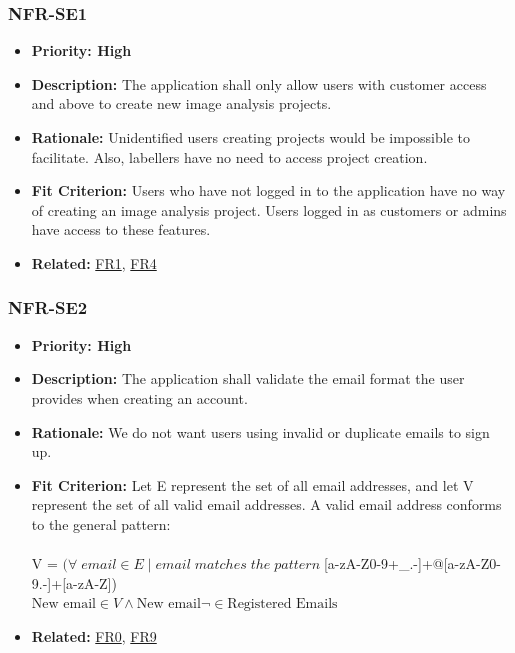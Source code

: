\documentclass[12pt]{article}
\begin{document}
\subsubsection*{NFR-SE1}
\label{sec:SE1}
\begin{itemize}
  \item \textbf{Priority: High}
  \item \textbf{Description:} The application shall only allow users with customer access and above to create new image analysis projects.
  \item \textbf{Rationale:} Unidentified users creating projects would be impossible to facilitate. Also, labellers have no need to access project creation. 
  \item \textbf{Fit Criterion:} Users who have not logged in to the application have no way of creating an image analysis project. Users logged in as customers or admins have access to these features.
  \item \textbf{Related:} \hyperref[sec:FR1]{FR1}, \hyperref[sec:FR4]{FR4}
\end{itemize}
\subsubsection*{NFR-SE2}
\label{sec:SE2}
\begin{itemize}
  \item \textbf{Priority: High}
  \item \textbf{Description:} The application shall validate the email format the user provides when creating an account.
  \item \textbf{Rationale:} We do not want users using invalid or duplicate emails to sign up.
  \item \textbf{Fit Criterion:} Let E represent the set of all email addresses, and let V represent the set of all valid email addresses. A valid email address conforms to the general pattern:\\\\
  V = $(\forall\; email \in E\;  |\; email \; matches \; the \; pattern \; $[a-zA-Z0-9+\_.-]+@[a-zA-Z0-9.-]+[a-zA-Z])\\
  $\text{New email} \in V \land \text{New email} \neg \in \text{Registered Emails}$
  \item \textbf{Related:}  \hyperref[sec:FR0]{FR0}, \hyperref[sec:FR9]{FR9}
\end{itemize}
\end{document}
